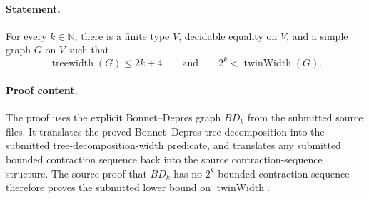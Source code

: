 \paragraph{Statement.}
For every \(k\in\mathbb{N}\), there is a finite type \(V\), decidable equality
on \(V\), and a simple graph \(G\) on \(V\) such that
\[
  \operatorname{treewidth}(G) \le 2k+4
  \qquad\text{and}\qquad
  2^k < \operatorname{twinWidth}(G).
\]

\paragraph{Proof content.}
The proof uses the explicit Bonnet--Depres graph \(BD_k\) from the submitted
source files.  It translates the proved Bonnet--Depres tree decomposition into
the submitted tree-decomposition-width predicate, and translates any submitted
bounded contraction sequence back into the source contraction-sequence
structure.  The source proof that \(BD_k\) has no \(2^k\)-bounded contraction
sequence therefore proves the submitted lower bound on
\(\operatorname{twinWidth}\).
